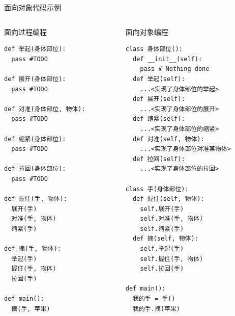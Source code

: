 \documentclass{beamer}
\begin{document}
    \begin{frame}[fragile]{面向对象代码示例}
      \begin{columns}
        \begin{column}{0.4\textwidth}
          \begin{block}{\tiny 面向过程编程}
            \begin{lstlisting}
def 举起(身体部位):
  pass #TODO   

def 展开(身体部位):
  pass #TODO 

def 对准(身体部位, 物体):
  pass #TODO 

def 缩紧(身体部位):
  pass #TODO 

def 拉回(身体部位):
  pass #TODO 

def 握住(手, 物体):
  展开(手)
  对准(手, 物体)
  缩紧(手)

def 摘(手, 物体):
  举起(手)
  握住(手, 物体)
  拉回(手)

def main():
  摘(手, 苹果)
            \end{lstlisting}
          \end{block}
        \end{column}
        \begin{column}{0.4\textwidth}
          \begin{block}{\tiny 面向对象编程}
            \begin{lstlisting}
class 身体部位():
  def __init__(self):
    pass # Nothing done
  def 举起(self):
    ...<实现了身体部位的举起>
  def 展开(self):
    ...<实现了身体部位的展开>
  def 缩紧(self):
    ...<实现了身体部位的缩紧>
  def 对准(self, 物体):
    ...<实现了身体部位对准某物体>
  def 拉回(self):
    ...<实现了身体部位的拉回>

class 手(身体部位):
  def 握住(self, 物体):
    self.展开(手)
    self.对准(手, 物体)
    self.缩紧(手)
  def 摘(self, 物体):
    self.举起(手)
    self.握住(手, 物体)
    self.拉回(手)
  
def main():
  我的手 = 手()
  我的手.摘(苹果)
            \end{lstlisting}
          \end{block}
        \end{column}
      \end{columns}
    \end{frame}
\end{document}
